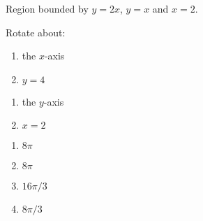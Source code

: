 {Region bounded by $y=2x$, $y=x$ and $x=2$.

Rotate about:

\noindent%
\begin{minipage}[t]{.5\linewidth}
\begin{enumerate}
\item		the $x$-axis
\item		$y=4$
\end{enumerate}
\end{minipage}
\begin{minipage}[t]{.5\linewidth}
\begin{enumerate}\addtocounter{enumii}{2}
\item		the $y$-axis
\item		$x=2$
\end{enumerate}
\end{minipage}
}
{\begin{enumerate}
\item $8\pi$
\item $8\pi$
\item $16\pi/3$
\item $8\pi/3$
\end{enumerate}
}
